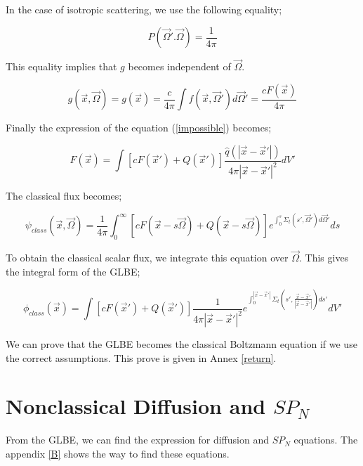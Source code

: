\documentclass[a4paper, 12pt]{report}
\begin{document}
In the case of isotropic scattering, we use the following equality;

\begin{equation}
P(\vec{\Omega}'.\vec{\Omega}) = \frac{1}{4\pi}
\end{equation}

This equality implies that $g$ becomes independent of $\vec{\Omega}$.

\begin{equation}
g(\vec{x},\vec{\Omega}) = g(\vec{x}) = \frac{c}{4\pi}\int f(\vec{x},\vec{\Omega}')d\vec{\Omega}' = \frac{c F(\vec{x})}{4\pi}
\end{equation}

Finally the expression of the equation (\ref{impossible}) becomes;

\begin{equation}
F(\vec{x}) = \int \left[cF(\vec{x}') + Q(\vec{x}') \right] \frac{\hat{q}(|\vec{x}-\vec{x}'|)}{4\pi |\vec{x}-\vec{x}'|^2}dV'
\end{equation}

The classical flux becomes;

\begin{equation}
\psi_{class}(\vec{x},\vec{\Omega}) = \frac{1}{4\pi}\int_0^\infty \left[ cF(\vec{x}-s\vec{\Omega}) + Q(\vec{x}-s\vec{\Omega}) \right] e^{\int_0^s \Sigma_t(s',\vec{\Omega}')d\vec{\Omega}'}ds
\end{equation}

To obtain the classical scalar flux, we integrate this equation over $\vec{\Omega}$. 
This gives the integral form of the GLBE;

\begin{equation}
\phi_{class}(\vec{x}) = \int \left[ cF(\vec{x}') + Q(\vec{x}') \right]\frac{1}{4\pi |\vec{x}-\vec{x}'|^2} e^{\int_0^{|\vec{x}-\vec{x}'|} \Sigma_t(s',\frac{\vec{x}-\vec{x}'}{|\vec{x}-\vec{x}'|})ds'} dV'
\end{equation}

We can prove that the GLBE becomes the classical Boltzmann equation if we use the correct assumptions. This prove is given in Annex \ref{return}.


\section{Nonclassical Diffusion and $SP_N$}

From the GLBE, we can find the expression for diffusion and $SP_N$ equations. The appendix \ref{B} shows the way to find these equations.
\end{document}
